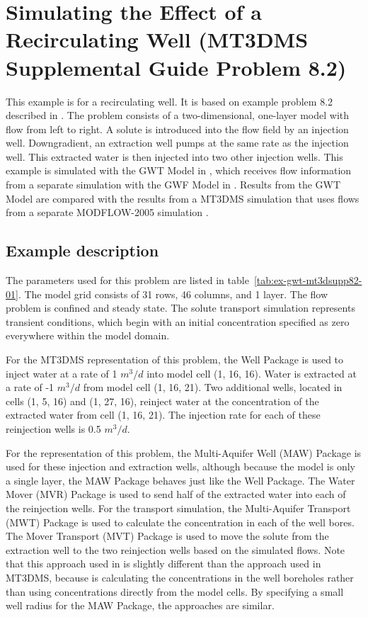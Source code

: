 \section{Simulating the Effect of a Recirculating Well (MT3DMS Supplemental Guide Problem 8.2)}

This example is for a recirculating well.  It is based on example problem 8.2 described in \cite{zheng2010mt3dmsv5.3}.  The problem consists of a two-dimensional, one-layer model with flow from left to right.  A solute is introduced into the flow field by an injection well.  Downgradient, an extraction well pumps at the same rate as the injection well.  This extracted water is then injected into two other injection wells.  This example is simulated with the GWT Model in \mf, which receives flow information from a separate simulation with the GWF Model in \mf.  Results from the GWT Model are compared with the results from a MT3DMS simulation \citep{zheng1990mt3d} that uses flows from a separate MODFLOW-2005 simulation \citep{modflow2005}.  

\subsection{Example description}

The parameters used for this problem are listed in table~\ref{tab:ex-gwt-mt3dsupp82-01}.  The model grid consists of 31 rows, 46 columns, and 1 layer.  The flow problem is confined and steady state.  The solute transport simulation represents transient conditions, which begin with an initial concentration specified as zero everywhere within the model domain.

For the MT3DMS representation of this problem, the Well Package is used to inject water at a rate of 1 $m^3/d$ into model cell (1, 16, 16).  Water is extracted at a rate of -1 $m^3/d$ from model cell (1, 16, 21).  Two additional wells, located in cells (1, 5, 16) and (1, 27, 16), reinject water at the concentration of the extracted water from cell (1, 16, 21).  The injection rate for each of these reinjection wells is 0.5 $m^3/d$.

For the \mf representation of this problem, the Multi-Aquifer Well (MAW) Package is used for these injection and extraction wells, although because the model is only a single layer, the MAW Package behaves just like the Well Package.  The Water Mover (MVR) Package is used to send half of the extracted water into each of the reinjection wells.  For the \mf transport simulation, the Multi-Aquifer Transport (MWT) Package is used to calculate the concentration in each of the well bores.  The Mover Transport (MVT) Package is used to move the solute from the extraction well to the two reinjection wells based on the simulated flows.  Note that this approach used in \mf is slightly different than the approach used in MT3DMS, because \mf is calculating the concentrations in the well boreholes rather than using concentrations directly from the model cells.  By specifying a small well radius for the MAW Package, the approaches are similar.

